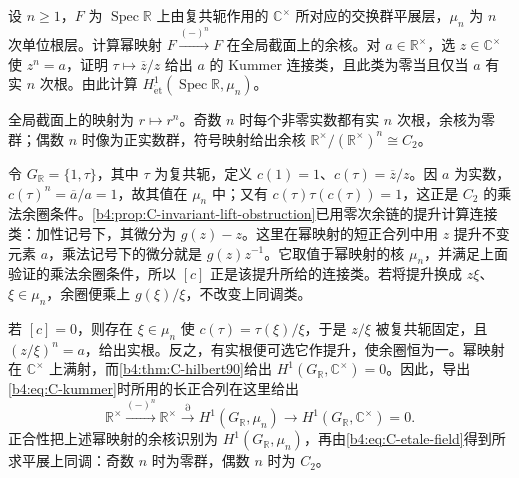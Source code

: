 \begin{exercise}\label{b4:ex:E-real-square-sections}
	设 \(n\ge1\)，\(F\) 为 \(\operatorname{Spec}\mathbb R\) 上由复共轭作用的 \(\mathbb C^\times\) 所对应的交换群平展层，\(\mu_n\) 为 \(n\) 次单位根层。计算幂映射 \(F\xrightarrow{(-)^n}F\) 在全局截面上的余核。对 \(a\in\mathbb R^\times\)，选 \(z\in\mathbb C^\times\) 使 \(z^n=a\)，证明 \(\tau\mapsto\overline z/z\) 给出 \(a\) 的 Kummer 连接类，且此类为零当且仅当 \(a\) 有实 \(n\) 次根。由此计算 \(H^1_{\mathrm{\acute et}}(\operatorname{Spec}\mathbb R,\mu_n)\)。
\end{exercise}
\begin{solution}
	全局截面上的映射为 \(r\mapsto r^n\)。奇数 \(n\) 时每个非零实数都有实 \(n\) 次根，余核为零群；偶数 \(n\) 时像为正实数群，符号映射给出余核 \(\mathbb R^\times/(\mathbb R^\times)^n\cong C_2\)。

	令 \(G_{\mathbb R}=\{1,\tau\}\)，其中 \(\tau\) 为复共轭，定义 \(c(1)=1\)、\(c(\tau)=\overline z/z\)。因 \(a\) 为实数，\(c(\tau)^n=\overline a/a=1\)，故其值在 \(\mu_n\) 中；又有 \(c(\tau)\tau(c(\tau))=1\)，这正是 \(C_2\) 的乘法余圈条件。\cref{b4:prop:C-invariant-lift-obstruction}已用零次余链的提升计算连接类：加性记号下，其微分为 \(g(z)-z\)。这里在幂映射的短正合列中用 \(z\) 提升不变元素 \(a\)，乘法记号下的微分就是 \(g(z)z^{-1}\)。它取值于幂映射的核 \(\mu_n\)，并满足上面验证的乘法余圈条件，所以 \([c]\) 正是该提升所给的连接类。若将提升换成 \(z\xi\)、\(\xi\in\mu_n\)，余圈便乘上 \(g(\xi)/\xi\)，不改变上同调类。

	若 \([c]=0\)，则存在 \(\xi\in\mu_n\) 使 \(c(\tau)=\tau(\xi)/\xi\)，于是 \(z/\xi\) 被复共轭固定，且 \((z/\xi)^n=a\)，给出实根。反之，有实根便可选它作提升，使余圈恒为一。幂映射在 \(\mathbb C^\times\) 上满射，而\cref{b4:thm:C-hilbert90}给出 \(H^1(G_{\mathbb R},\mathbb C^\times)=0\)。因此，导出\eqref{b4:eq:C-kummer}时所用的长正合列在这里给出
	\[
		\mathbb R^\times\xrightarrow{(-)^n}\mathbb R^\times \xrightarrow{\partial}H^1(G_{\mathbb R},\mu_n) \longrightarrow H^1(G_{\mathbb R},\mathbb C^\times)=0.
	\]
	正合性把上述幂映射的余核识别为 \(H^1(G_{\mathbb R},\mu_n)\)，再由\eqref{b4:eq:C-etale-field}得到所求平展上同调：奇数 \(n\) 时为零群，偶数 \(n\) 时为 \(C_2\)。
\end{solution}
